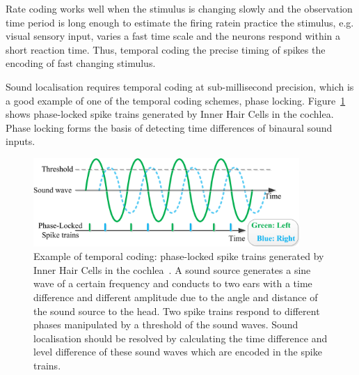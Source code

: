 Rate coding works well when the stimulus is changing slowly and the observation time period is long enough to estimate the firing rate\DIFdelbegin {}\DIFdelend \DIFaddbegin {}\DIFaddend in practice the stimulus, e.g. visual sensory input, varies \DIFdelbegin {}\DIFdelend \DIFaddbegin {}\DIFaddend a fast time scale and the neurons respond within a short reaction time.
Thus, temporal coding \DIFdelbegin {}\DIFdelend \DIFaddbegin {}\DIFaddend the precise timing of spikes \DIFdelbegin {}\DIFdelend \DIFaddbegin {}\DIFaddend the encoding of \DIFaddbegin {}\DIFaddend fast changing stimulus.

Sound localisation requires temporal coding at sub-millisecond precision, which is a good example of one of the temporal coding schemes, phase locking.
Figure~\ref{Fig:audio_fibre} shows phase-locked spike trains generated by Inner Hair Cells in the cochlea.
Phase locking forms the basis
of detecting time differences of binaural sound inputs.
\begin{figure}[bt]
	\centering
	\includegraphics[width=0.9\textwidth]{pics_snn/phaselocking.png}
	\caption{Example of temporal coding: phase-locked spike trains generated by Inner Hair Cells in the cochlea~\citep{liu2013modeling}.
	A sound source generates a sine wave of a certain frequency and conducts to two ears with a time difference and different amplitude due to the angle and distance of the sound source to the head.
	Two spike trains respond to different phases manipulated by a threshold of the sound waves.
	Sound localisation should be resolved by calculating the time difference and level difference of these sound waves which are encoded in the spike trains.
    }
	\label{Fig:audio_fibre}
\end{figure}

